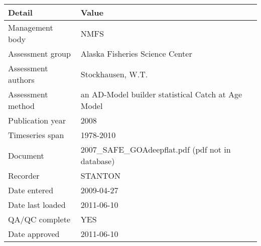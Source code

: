 \begin{table}[htb]
\centering
\begin{tabular}{lp{7cm}}
\toprule
Detail & Value \\
\midrule
Management body    & NMFS                                               \\
Assessment group   & Alaska Fisheries Science Center                    \\
Assessment authors & Stockhausen, W.T.                                  \\
Assessment method  & an AD-Model builder statistical Catch at Age Model \\
Publication year   & 2008                                               \\
Timeseries span    & 1978-2010                                          \\
Document           & 2007\_SAFE\_GOAdeepflat.pdf (pdf not in database)  \\
Recorder           & STANTON                                            \\
Date entered       & 2009-04-27                                         \\
Date last loaded   & 2011-06-10                                         \\
QA/QC complete     & YES                                                \\
Date approved      & 2011-06-10                                         \\
\bottomrule
\end{tabular}
\label{tab:assessdet}
\end{table}
